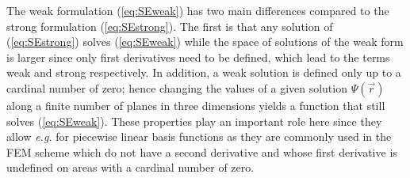 The weak formulation (\ref{eq:SEweak}) has two main differences compared to the strong formulation (\ref{eq:SEstrong}).
The first is that any solution of (\ref{eq:SEstrong}) solves (\ref{eq:SEweak}) while the space of solutions of the weak form is larger since only first derivatives need to be defined, which lead to the terms weak and strong respectively.
In addition, a weak solution is defined only up to a cardinal number of zero; hence changing the values of a given solution $\Psi(\vec{r})$ along a finite number of planes in three dimensions yields a function that still solves (\ref{eq:SEweak}).
These properties play an important role here since they allow \textit{e.g.} for piecewise linear basis functions as they are commonly used in the FEM scheme which do not have a second derivative and whose first derivative is undefined on areas with a cardinal number of zero.

